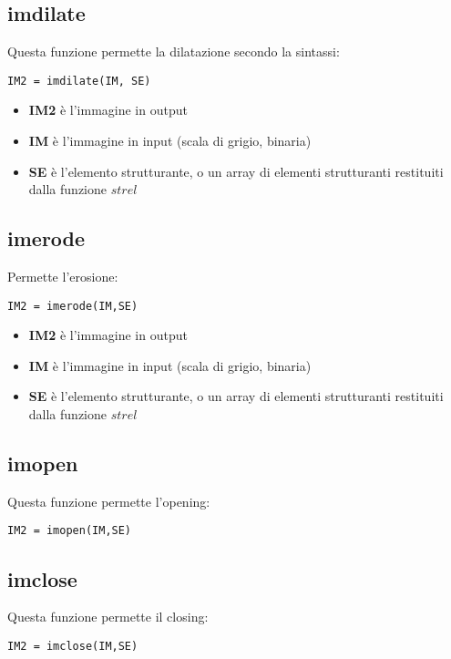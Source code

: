 \subsection{imdilate}
Questa funzione permette la dilatazione secondo la sintassi:

\begin{lstlisting}
IM2 = imdilate(IM, SE)
\end{lstlisting}

\begin{itemize}
	\item \textbf{IM2} è l'immagine in output
	\item \textbf{IM} è l'immagine in input (scala di grigio, binaria)
	\item \textbf{SE} è l'elemento strutturante, o un array di elementi strutturanti restituiti dalla funzione $strel$
\end{itemize}

\subsection{imerode}
Permette l'erosione:

\begin{lstlisting}
IM2 = imerode(IM,SE)
\end{lstlisting}

\begin{itemize}
	\item \textbf{IM2} è l'immagine in output
	\item \textbf{IM} è l'immagine in input (scala di grigio, binaria)
	\item \textbf{SE} è l'elemento strutturante, o un array di elementi strutturanti restituiti dalla funzione $strel$
\end{itemize}

\subsection{imopen}
Questa funzione permette l'opening:

\begin{lstlisting}
IM2 = imopen(IM,SE)
\end{lstlisting}

\subsection{imclose}
Questa funzione permette il closing:

\begin{lstlisting}
IM2 = imclose(IM,SE)
\end{lstlisting}

